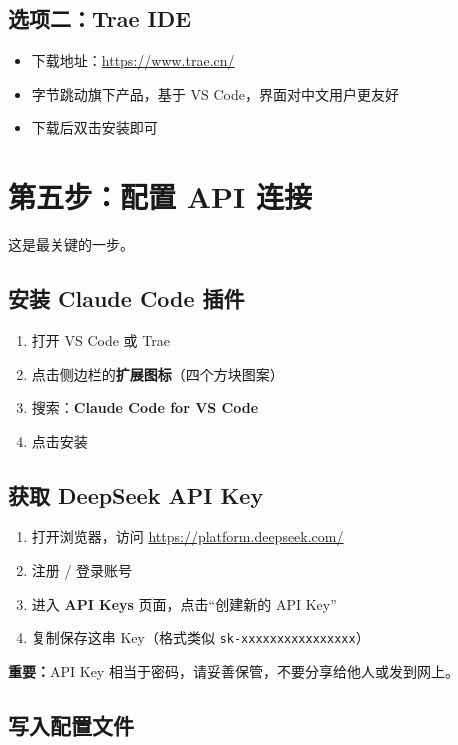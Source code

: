 \documentclass[12pt,a4paper]{ctexart}
\begin{document}
\subsection{选项二：Trae IDE}

\begin{itemize}[nosep]
    \item 下载地址：\url{https://www.trae.cn/}
    \item 字节跳动旗下产品，基于 VS Code，界面对中文用户更友好
    \item 下载后双击安装即可
\end{itemize}

\section{第五步：配置 API 连接}

这是最关键的一步。

\subsection{安装 Claude Code 插件}

\begin{enumerate}[nosep]
    \item 打开 VS Code 或 Trae
    \item 点击侧边栏的\textbf{扩展图标}（四个方块图案）
    \item 搜索：\textbf{Claude Code for VS Code}
    \item 点击安装
\end{enumerate}

\subsection{获取 DeepSeek API Key}

\begin{enumerate}[nosep]
    \item 打开浏览器，访问 \url{https://platform.deepseek.com/}
    \item 注册 / 登录账号
    \item 进入 \textbf{API Keys} 页面，点击``创建新的 API Key''
    \item 复制保存这串 Key（格式类似 \texttt{sk-xxxxxxxxxxxxxxxx}）
\end{enumerate}

\textbf{重要：}API Key 相当于密码，请妥善保管，不要分享给他人或发到网上。

\subsection{写入配置文件}
\end{document}
